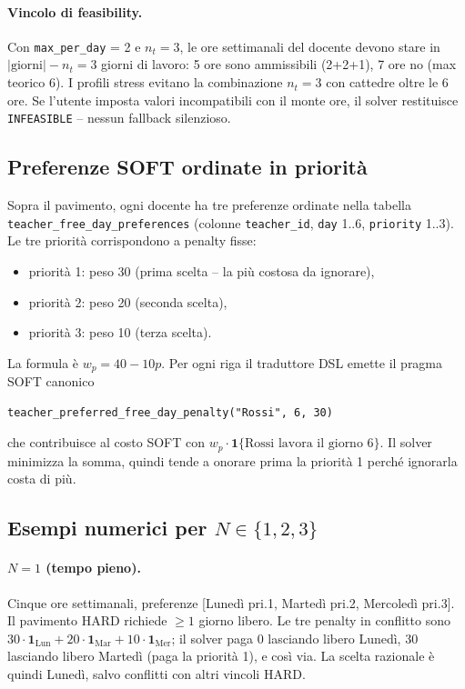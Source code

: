 \paragraph{Vincolo di feasibility.} Con \texttt{max\_per\_day} = 2
e $n_t = 3$, le ore settimanali del docente devono stare
in $|\mathrm{giorni}| - n_t = 3$ giorni di lavoro: 5 ore
sono ammissibili (2+2+1), 7 ore no (max teorico 6). I
profili stress evitano la combinazione $n_t = 3$ con cattedre
oltre le 6 ore. Se l'utente imposta valori incompatibili
con il monte ore, il solver restituisce
\texttt{INFEASIBLE} -- nessun fallback silenzioso.

\subsection*{Preferenze SOFT ordinate in priorit\`a}

Sopra il pavimento, ogni docente ha tre preferenze ordinate
nella tabella \texttt{teacher\_free\_day\_preferences}
(colonne \texttt{teacher\_id}, \texttt{day} 1..6,
\texttt{priority} 1..3). Le tre priorit\`a corrispondono a
penalty fisse:
\begin{itemize}
  \item priorit\`a 1: peso 30 (prima scelta -- la pi\`u
    costosa da ignorare),
  \item priorit\`a 2: peso 20 (seconda scelta),
  \item priorit\`a 3: peso 10 (terza scelta).
\end{itemize}
La formula \`e $w_p = 40 - 10 p$. Per ogni riga il
traduttore DSL emette il pragma SOFT canonico
\begin{verbatim}
teacher_preferred_free_day_penalty("Rossi", 6, 30)
\end{verbatim}
che contribuisce al costo SOFT con $w_p \cdot
\mathbf{1}\{\text{Rossi lavora il giorno 6}\}$. Il
solver minimizza la somma, quindi tende a onorare prima la
priorit\`a 1 perch\'e ignorarla costa di pi\`u.

\subsection*{Esempi numerici per $N \in \{1, 2, 3\}$}

\paragraph{$N = 1$ (tempo pieno).} Cinque ore settimanali,
preferenze [Luned\`i pri.1, Marted\`i pri.2, Mercoled\`i
pri.3]. Il pavimento HARD richiede $\ge 1$ giorno libero.
Le tre penalty in conflitto sono $30 \cdot \mathbf{1}_{\mathrm{Lun}} + 20 \cdot \mathbf{1}_{\mathrm{Mar}} + 10 \cdot
\mathbf{1}_{\mathrm{Mer}}$; il solver paga 0 lasciando libero
Luned\`i, 30 lasciando libero Marted\`i (paga la
priorit\`a 1), e cos\`i via. La scelta razionale \`e
quindi Luned\`i, salvo conflitti con altri vincoli HARD.

